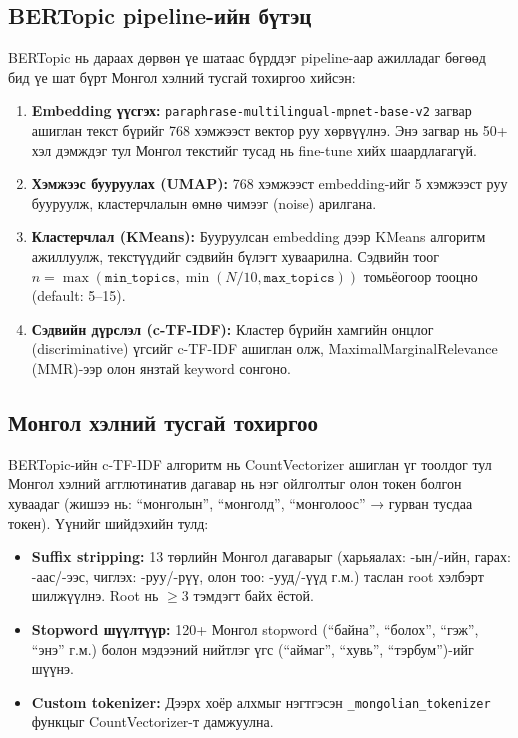 \subsection{BERTopic pipeline-ийн бүтэц}

BERTopic нь дараах дөрвөн үе шатаас бүрддэг pipeline-аар ажилладаг бөгөөд бид үе шат бүрт Монгол хэлний тусгай тохиргоо хийсэн:

\begin{enumerate}
    \item \textbf{Embedding үүсгэх:} \texttt{paraphrase-multilingual-mpnet-base-v2} загвар ашиглан текст бүрийг 768 хэмжээст вектор руу хөрвүүлнэ. Энэ загвар нь 50+ хэл дэмждэг тул Монгол текстийг тусад нь fine-tune хийх шаардлагагүй.
    \item \textbf{Хэмжээс бууруулах (UMAP):} 768 хэмжээст embedding-ийг 5 хэмжээст руу бууруулж, кластерчлалын өмнө чимээг (noise) арилгана.
    \item \textbf{Кластерчлал (KMeans):} Бууруулсан embedding дээр KMeans алгоритм ажиллуулж, текстүүдийг сэдвийн бүлэгт хуваарилна. Сэдвийн тоог $n = \max(\texttt{min\_topics}, \min(N/10, \texttt{max\_topics}))$ томьёогоор тооцно (default: 5--15).
    \item \textbf{Сэдвийн дүрслэл (c-TF-IDF):} Кластер бүрийн хамгийн онцлог (discriminative) үгсийг c-TF-IDF ашиглан олж, MaximalMarginalRelevance (MMR)-ээр олон янзтай keyword сонгоно.
\end{enumerate}

\subsection{Монгол хэлний тусгай тохиргоо}

BERTopic-ийн c-TF-IDF алгоритм нь CountVectorizer ашиглан үг тоолдог тул Монгол хэлний агглютинатив дагавар нь нэг ойлголтыг олон токен болгон хуваадаг (жишээ нь: ``монголын'', ``монголд'', ``монголоос'' → гурван тусдаа токен). Үүнийг шийдэхийн тулд:

\begin{itemize}
    \item \textbf{Suffix stripping:} 13 төрлийн Монгол дагаварыг (харьяалах: -ын/-ийн, гарах: -аас/-ээс, чиглэх: -руу/-рүү, олон тоо: -ууд/-үүд г.м.) таслан root хэлбэрт шилжүүлнэ. Root нь $\geq 3$ тэмдэгт байх ёстой.
    \item \textbf{Stopword шүүлтүүр:} 120+ Монгол stopword (``байна'', ``болох'', ``гэж'', ``энэ'' г.м.) болон мэдээний нийтлэг үгс (``аймаг'', ``хувь'', ``тэрбум'')-ийг шүүнэ.
    \item \textbf{Custom tokenizer:} Дээрх хоёр алхмыг нэгтгэсэн \texttt{\_mongolian\_tokenizer} функцыг CountVectorizer-т дамжуулна.
\end{itemize}

